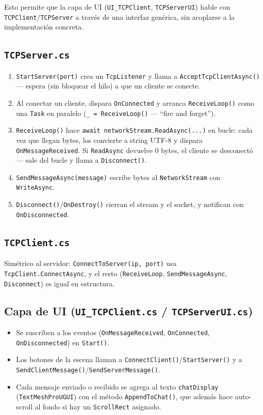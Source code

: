 \documentclass[11pt,a4paper]{article}
\begin{document}
Esto permite que la capa de UI (\texttt{UI\_TCPClient}, \texttt{TCPServerUI}) hable con
\texttt{TCPClient}/\texttt{TCPServer} a través de una interfaz genérica, sin acoplarse a la
implementación concreta.

\subsection{\texttt{TCPServer.cs}}
\begin{enumerate}
  \item \texttt{StartServer(port)} crea un \texttt{TcpListener} y llama a \texttt{AcceptTcpClientAsync()} — espera (sin bloquear el hilo) a que un cliente se conecte.
  \item Al conectar un cliente, dispara \texttt{OnConnected} y arranca \texttt{ReceiveLoop()} como una \texttt{Task} en paralelo (\texttt{\_ = ReceiveLoop()} — ``fire and forget'').
  \item \texttt{ReceiveLoop()} hace \texttt{await networkStream.ReadAsync(...)} en bucle: cada vez que llegan bytes, los convierte a string UTF-8 y dispara \texttt{OnMessageReceived}. Si \texttt{ReadAsync} devuelve 0 bytes, el cliente se desconectó — sale del bucle y llama a \texttt{Disconnect()}.
  \item \texttt{SendMessageAsync(message)} escribe bytes al \texttt{NetworkStream} con \texttt{WriteAsync}.
  \item \texttt{Disconnect()}/\texttt{OnDestroy()} cierran el stream y el socket, y notifican con \texttt{OnDisconnected}.
\end{enumerate}

\subsection{\texttt{TCPClient.cs}}
Simétrico al servidor: \texttt{ConnectToServer(ip, port)} usa \texttt{TcpClient.ConnectAsync}, y el
resto (\texttt{ReceiveLoop}, \texttt{SendMessageAsync}, \texttt{Disconnect}) es igual en estructura.

\subsection{Capa de UI (\texttt{UI\_TCPClient.cs} / \texttt{TCPServerUI.cs})}
\begin{itemize}
  \item Se suscriben a los eventos (\texttt{OnMessageReceived}, \texttt{OnConnected}, \texttt{OnDisconnected}) en \texttt{Start()}.
  \item Los botones de la escena llaman a \texttt{ConnectClient()}/\texttt{StartServer()} y a \texttt{SendClientMessage()}/\texttt{SendServerMessage()}.
  \item Cada mensaje enviado o recibido se agrega al texto \texttt{chatDisplay} (\texttt{TextMeshProUGUI}) con el método \texttt{AppendToChat()}, que además hace auto-scroll al fondo si hay un \texttt{ScrollRect} asignado.
\end{itemize}
\end{document}
